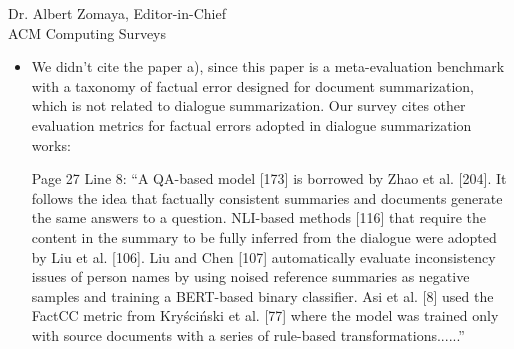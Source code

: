 \documentclass[11pt]{letter} %
\begin{document}
\begin{letter}{
Dr. Albert Zomaya, Editor-in-Chief  \\
ACM Computing Surveys}
\begin{enumerate}
\begin{itemize}
			\quad b) and c), Page 33 Line 24: ``Wang et al. [174] classified factual errors in a similar way to Tang et al. [162] and propose a model-level evaluation schema for discriminating better summarization models, which is different from the widely-accepted sample-level evaluation schema that scores generated summaries and can further scoring the model based on their corresponding outputs. They evaluated the model by calculating the generation probability of faithful and unfaithful summaries collected by rule-based transformations based on their taxonomy. The generalization ability for this work among different datasets and scenarios is doubtful, since a similar work for news summarization, FactCC [77], which is a metric trained based on rule-based synthetic datasets shows a poor generalization ability by Laban et al. [79].''
			
			\quad d), Page 33 Line 5: ``Recent work from Gao and Wan [54] re-evaluated 18 evaluation metrics and did a unified human evaluation with 14 dialogue summarization models on SAMSum dataset. Their results not only show the inconsistent performances of metrics between document summarization and dialogue summarization, and none of them excel in all dimensions for dialogue summarization, but also raise a warning on rethinking whether recently proposed complex models and fancy techniques truly improve the basic pre-trained language model......."
			
			\item We didn't cite the paper a), since this paper is a meta-evaluation benchmark with a taxonomy of factual error designed for document summarization, which is not related to dialogue summarization. Our survey cites other evaluation metrics for factual errors adopted in dialogue summarization works: 
			
			\quad Page 27 Line 8: ``A QA-based model [173] is borrowed by Zhao et al. [204]. It follows the idea that factually consistent summaries and documents generate the same answers to a question. NLI-based methods [116] that require the content in the summary to be fully inferred from the dialogue were adopted by Liu et al. [106]. Liu and Chen [107] automatically evaluate inconsistency issues of person names by using noised reference summaries as negative samples and training a BERT-based binary classifier. Asi et al. [8] used the FactCC metric from Kryściński et al. [77] where the model was trained only with source documents with a series of rule-based transformations......''
		\end{itemize}
		

\end{enumerate}
\end{letter}
\end{document}
